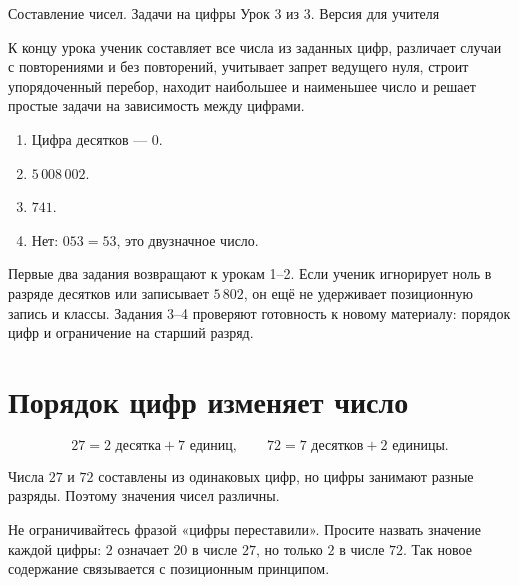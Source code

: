 
\worksheettitle
  {Составление чисел. Задачи на цифры}
  {Урок 3 из 3. Версия для учителя}

\begin{teacherbox}
  К концу урока ученик составляет все числа из заданных цифр, различает
  случаи с повторениями и без повторений, учитывает запрет ведущего нуля,
  строит упорядоченный перебор, находит наибольшее и наименьшее число и
  решает простые задачи на зависимость между цифрами.
\end{teacherbox}

\begin{checkpointbox}
  \begin{enumerate}[label=\textbf{\arabic*.},itemsep=0.35em]
    \item Цифра десятков --- \(0\).
    \item \(5\,008\,002\).
    \item \(741\).
    \item Нет: \(053=53\), это двузначное число.
  \end{enumerate}
\end{checkpointbox}

\begin{teacherbox}
  Первые два задания возвращают к урокам 1--2. Если ученик игнорирует ноль
  в разряде десятков или записывает \(5\,802\), он ещё не удерживает
  позиционную запись и классы. Задания 3--4 проверяют готовность к новому
  материалу: порядок цифр и ограничение на старший разряд.
\end{teacherbox}

\section{Порядок цифр изменяет число}

\orderchangesfigure

\[
  27=2\text{ десятка}+7\text{ единиц},
  \qquad
  72=7\text{ десятков}+2\text{ единицы}.
\]

\begin{conclusionbox}
  Числа \(27\) и \(72\) составлены из одинаковых цифр, но цифры занимают
  разные разряды. Поэтому значения чисел различны.
\end{conclusionbox}

\begin{teacherbox}
  Не ограничивайтесь фразой «цифры переставили». Просите назвать значение
  каждой цифры: \(2\) означает \(20\) в числе \(27\), но только \(2\) в
  числе \(72\). Так новое содержание связывается с позиционным принципом.
\end{teacherbox}

